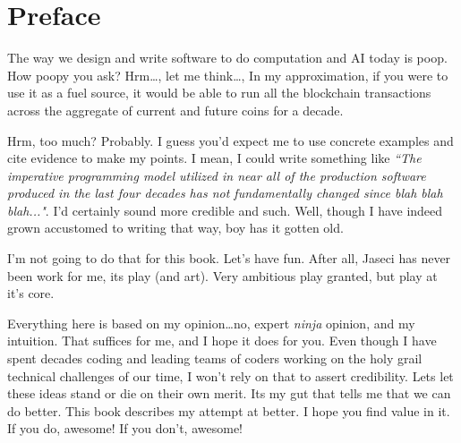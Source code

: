 \chapter*{Preface}

The way we design and write software to do computation and AI today is poop. How poopy you ask? Hrm\dots, let me think\dots, In my approximation, if you were to use it as a fuel source, it would be able to run all the blockchain transactions across the aggregate of current and future coins for a decade.
\par
Hrm, too much? Probably. I guess you'd expect me to use concrete examples and cite evidence to make my points. I mean, I could write something like \textit{``The imperative programming model utilized in near all of the production software produced in the last four decades has not fundamentally changed since blah blah blah..."}. I'd certainly sound more credible and such. Well, though I have indeed grown accustomed to writing that way, boy has it gotten old.
\par
I'm not going to do that for this book. Let's have fun. After all, Jaseci has never been work for me, its play (and art). Very ambitious play granted, but play at it's core.
\par
Everything here is based on my opinion\dots no, expert \emph{ninja} opinion, and my intuition. That suffices for me, and I hope it does for you. Even though I have spent decades coding and leading teams of coders working on the holy grail technical challenges of our time, I won't rely on that to assert credibility. Lets let these ideas stand or die on their own merit. Its my gut that tells me that we can do better. This book describes my attempt at better. I hope you find value in it. If you do, awesome! If you don't, awesome!
